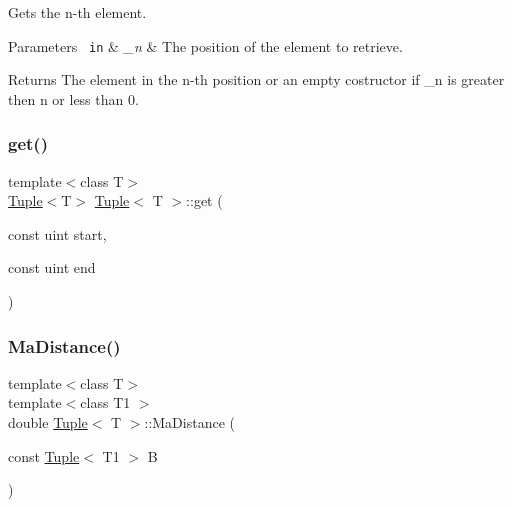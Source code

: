 Gets the n-\/th element. 


\begin{DoxyParams}[1]{Parameters}
\mbox{\texttt{ in}}  & {\em \+\_\+n} & The position of the element to retrieve. \\
\hline
\end{DoxyParams}
\begin{DoxyReturn}{Returns}
The element in the n-\/th position or an empty costructor if \+\_\+n is greater then n or less than 0. 
\end{DoxyReturn}
\mbox{\label{class_tuple_a7cd0c2fb33a5861e3f171614881393ce}} 
\subsubsection{\texorpdfstring{get()}{get()}\hspace{0.1cm}{\footnotesize\ttfamily [2/2]}}
{\footnotesize\ttfamily template$<$class T$>$ \\
\mbox{\hyperlink{class_tuple}{Tuple}}$<$T$>$ \mbox{\hyperlink{class_tuple}{Tuple}}$<$ T $>$\+::get (\begin{DoxyParamCaption}\item[{const uint}]{start,  }\item[{const uint}]{end }\end{DoxyParamCaption})\hspace{0.3cm}{\ttfamily [inline]}}

\mbox{\label{class_tuple_ac668269743d9be71769c9b4a424c785f}} 
\subsubsection{\texorpdfstring{MaDistance()}{MaDistance()}}
{\footnotesize\ttfamily template$<$class T$>$ \\
template$<$class T1 $>$ \\
double \mbox{\hyperlink{class_tuple}{Tuple}}$<$ T $>$\+::Ma\+Distance (\begin{DoxyParamCaption}\item[{const \mbox{\hyperlink{class_tuple}{Tuple}}$<$ T1 $>$}]{B }\end{DoxyParamCaption})\hspace{0.3cm}{\ttfamily [inline]}}



